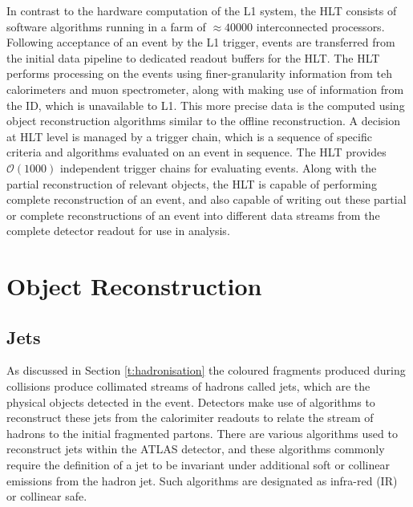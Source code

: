 	In contrast to the hardware computation of the L1 system, the HLT consists of software algorithms running in a farm  of $\approx40000$ interconnected processors\cite{trigrun22017}. Following acceptance of an event by the L1 trigger, events are transferred from the initial data pipeline to dedicated readout buffers for the HLT. The HLT performs processing on the events using finer-granularity information from teh calorimeters and muon spectrometer, along with making use of information from the ID, which is unavailable to L1. This more precise data is the computed using object reconstruction algorithms similar to the offline reconstruction. A decision at HLT level is managed by a trigger chain, which is a sequence of specific criteria and algorithms evaluated on an event in sequence. The HLT provides $\mathcal{O}(1000)$ independent trigger chains for evaluating events. Along with the partial reconstruction of relevant objects, the HLT is capable of performing complete reconstruction of an event, and also capable of writing out these partial or complete reconstructions of an event into different data streams from the complete detector readout for use in analysis.


\section{Object Reconstruction}

	\subsection{Jets}

	As discussed in Section \ref{t:hadronisation} the coloured fragments produced during collisions produce collimated streams of hadrons called jets, which are the physical objects detected in the event. Detectors make use of algorithms to reconstruct these jets from the calorimiter readouts to relate the stream of hadrons to the initial fragmented partons. There are various algorithms used to reconstruct jets within the ATLAS detector, and these algorithms commonly require the definition of a jet to be invariant under additional soft or collinear emissions from the hadron jet. Such algorithms are designated as infra-red (IR) or collinear safe.

